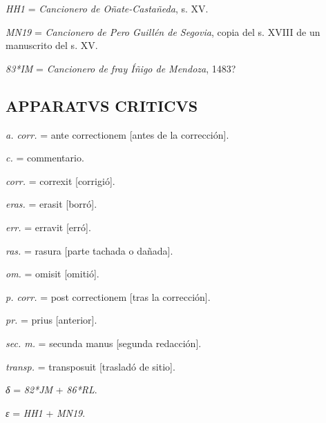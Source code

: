 \documentclass[11pt,a4paper,twoside]{article}
\begin{document}
\textit{HH1} = \textit{Cancionero de Oñate-Castañeda}, s. XV.

\textit{MN19} = \textit{Cancionero de Pero Guillén de Segovia}, copia del s. XVIII de un manuscrito del s. XV.

\textit{83*IM} = \textit{Cancionero de fray Íñigo de Mendoza}, 1483?

\subsection*{{\fontsize{11}{11.96}\selectfont APPARATVS CRITICVS}}

\textit{a. corr.} = ante correctionem [antes de la corrección].

\textit{c.} = commentario.

\textit{corr.} = correxit [corrigió].

\textit{eras.} = erasit [borró].

\textit{err.} = erravit [erró].

\textit{ras.} = rasura [parte tachada o dañada].

\textit{om.} = omisit [omitió].

\textit{p. corr.} = post correctionem [tras la corrección].

\textit{pr.} = prius [anterior].

\textit{sec. m.} = secunda manus [segunda redacción].

\textit{transp.} = transposuit [trasladó de sitio].

\textit{δ} = \textit{82*JM} + \textit{86*RL}.

\textit{ε} = \textit{HH1} + \textit{MN19}.
\end{document}
